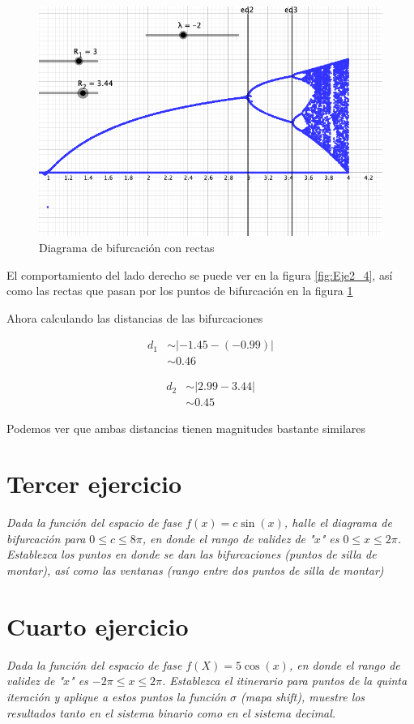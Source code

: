 \documentclass[11pt]{report}
\theoremstyle{plain}
\theoremstyle{definition}
\begin{document}
\begin{figure}[!h] %
	\centering
	\includegraphics[scale=0.3]{caos_2_5.png}
	\caption{Diagrama de bifurcación con rectas}
	\label{fig:Eje2_5}
\end{figure}


El comportamiento del lado derecho se puede ver en la figura \ref{fig:Eje2_4}, así como las rectas que pasan por los puntos de bifurcación en la figura \ref{fig:Eje2_5}


Ahora calculando las distancias de las bifurcaciones 

\begin{align*}
	d_1 &\sim |-1.45-(-0.99)|\\
	&\sim 0.46
\end{align*}

\begin{align*}
	d_2 &\sim |2.99-3.44|\\
	&\sim 0.45
\end{align*}

Podemos ver que ambas distancias tienen magnitudes bastante similares
\section{Tercer ejercicio}
\textit{Dada la función del espacio de fase $f(x) = c\sin(x)$, halle el diagrama de bifurcación para $0\leq c \leq 8\pi$, en donde el rango de validez de "$x$" es $0\leq x \leq 2\pi$. Establezca los puntos en donde se dan las bifurcaciones (puntos de silla de montar), así como las ventanas (rango entre dos puntos de silla de montar)}
\section{Cuarto ejercicio}
\textit{Dada la función del espacio de fase $f(X) = 5\cos(x)$, en donde el rango de validez de "$x$" es $-2\pi\leq x \leq 2\pi$. Establezca el itinerario para puntos de la quinta iteración y aplique a estos puntos la función $\sigma$ (mapa shift), muestre los resultados tanto en el sistema binario como en el sistema decimal.}
\end{document}
